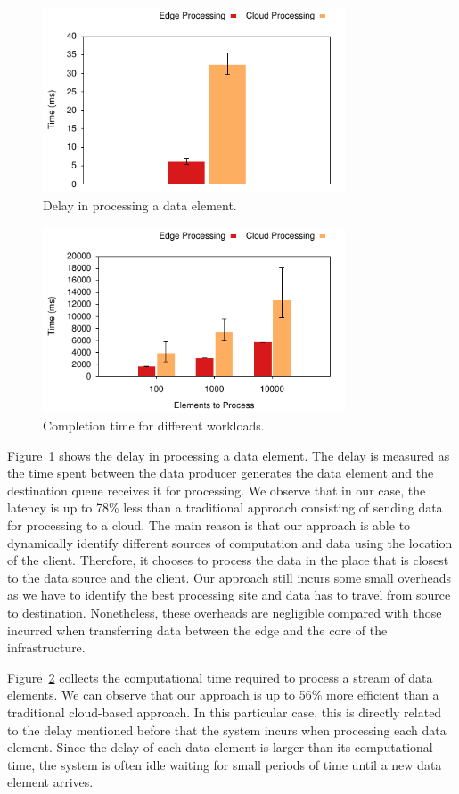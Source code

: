 \begin{figure}[h]
  \centering
    \includegraphics[width=0.8\textwidth]{Figures/Latency.pdf}
  \caption{Delay in processing a data element.} \label{fig:perf2}
\end{figure}
\begin{figure}[h]
  \centering
  	\includegraphics[width=0.8\textwidth]{Figures/EdgeVsCloud.pdf}
  \caption{Completion time for different workloads.} \label{fig:perf1}
\end{figure}

Figure~\ref{fig:perf2} shows the delay in processing a data element. The delay is measured as the time spent between the data producer generates the data element and the destination queue receives it for processing. We observe that in our case, the latency is up to 78\% less than a traditional approach consisting of sending data for processing to a cloud. The main reason is that our approach is able to dynamically identify different sources of computation and data using the location of the client. Therefore, it chooses to process the data in the place that is closest to the data source and the client. Our approach still incurs some small overheads as we have to identify the best processing site and data has to travel from source to destination. Nonetheless, these overheads are negligible compared with those incurred when transferring data between the edge and the core of the infrastructure.

Figure~\ref{fig:perf1} collects the computational time required to process a stream of data elements. We can observe that our approach is up to 56\% more efficient than a traditional cloud-based approach. In this particular case, this is directly related to the delay mentioned before that the system incurs when processing each data element. Since the delay of each data element is larger than its computational time, the system is often idle waiting for small periods of time until a new data element arrives.